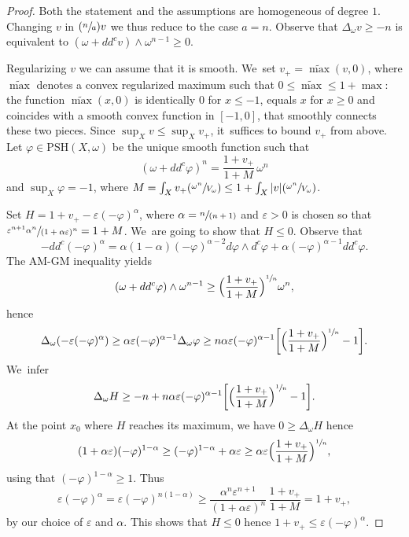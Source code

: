 \documentclass[11pt]{article}
\numberwithin{equation}{section}
\newcommand{\Psfrac}[2]{(\sfrac{#1}{#2})}
\newcommand{\spfrac}[2]{\sfrac{#1}{(#2)}}
\theoremstyle{definition}
\let\e\varepsilon
\let\f\varphi
\newcommand \PSH {\mathrm{PSH}}
\begin{document}
\begin{proof}
Both the statement and the assumptions are homogeneous of degree $1$.
Changing $v$ in $\Psfrac{n}{a} v$ we thus reduce to the case $a=n$.
Observe that $\Delta_{\omega} v \geq -n$ is equivalent to $(\omega+dd^c v) \wedge \omega^{n-1} \geq 0$.

Regularizing $v$ we can assume that it is smooth. We~set $v_+=\widetilde{\max}(v,0)$, where
$\widetilde{\max}$ denotes a convex regularized maximum such that $0\leq \widetilde{\max} \leq 1+ \max$:
the function $\widetilde{\max}(x,0)$ is identically $0$ for $x \leq -1$, equals $x$ for $x \geq 0$ and
coincides with a smooth convex function in $[-1,0]$, that smoothly connects these two pieces.
Since $\sup_X v \leq \sup_X v_+$, it~suffices to bound $v_+$ from above.
Let $\f \in\PSH(X,\omega)$ be the unique smooth function such that\vspace*{-3pt}
\[
(\omega+dd^c \f)^n=\frac{1+v_+}{1+M}\, \omega^n
\]
and $\sup_X \f=-1$, where
$M=\int_X v_+ \Psfrac{\omega^n}{V_\omega} \leq 1+ \int_X |v| \Psfrac{\omega^n}{V_\omega}$.

Set $H=1+v_+-\e (-\f)^{\alpha}$, where $\alpha=\spfrac{n}{n+1}$ and
$\e>0$ is chosen so that $\sfrac{\e^{n+1}\alpha^n}{(1+\alpha \e)^n}=1+M$. We~are going to show that $H \leq 0$.
Observe that
\[
-dd^c (-\f)^{\alpha}=\alpha(1-\alpha) (-\f)^{\alpha-2} d\f \wedge d^c \f +\alpha(-\f)^{\alpha-1} dd^c \f.
\]
The AM-GM inequality yields\vspace*{-3pt}
\[
(\omega+dd^c \f) \wedge \omega^{n-1} \geq \Bigl(\frac{1+v_+}{1+M} \Bigr)^{\sfrac{1}{n}} \omega^n,
\]
hence\vspace*{-3pt}
\[
\Delta_{\omega}(-\e (-\f)^{\alpha}) \geq \alpha \e(-\f)^{\alpha-1} \Delta_{\omega} \f
\geq n \alpha \e(-\f)^{\alpha-1} \biggl[ \Bigl(\frac{1+v_+}{1+M} \Bigr)^{\sfrac{1}{n}} -1 \biggr].
\]
We~infer
\[
\Delta_{\omega}H \geq -n+n \alpha \e(-\f)^{\alpha-1} \biggl[ \Bigl(\frac{1+v_+}{1+M} \Bigr)^{\sfrac{1}{n}} -1 \biggr].
\]
At the point $x_0$ where $H$ reaches its maximum, we have $0 \geq \Delta_{\omega}H $ hence
\[
(1+\alpha \e)(-\f)^{1-\alpha} \geq (-\f)^{1-\alpha}+\alpha \e \geq
\alpha \e \Bigl(\frac{1+v_+}{1+M} \Bigr)^{\sfrac{1}{n}},
\]
using that $(-\f)^{1-\alpha} \geq 1$. Thus
\[
\e (-\f)^{\alpha}=\e (-\f)^{n(1-\alpha)} \geq \frac{\alpha^n \e^{n+1}}{(1+\alpha \e)^n}\, \frac{1+v_+}{1+M}=1+v_+,
\]
by our choice of $\e$ and $\alpha$. This shows that $H \leq 0$
hence $1+v_+ \leq \e (-\f)^{\alpha}$.


\end{proof}
\end{document}
